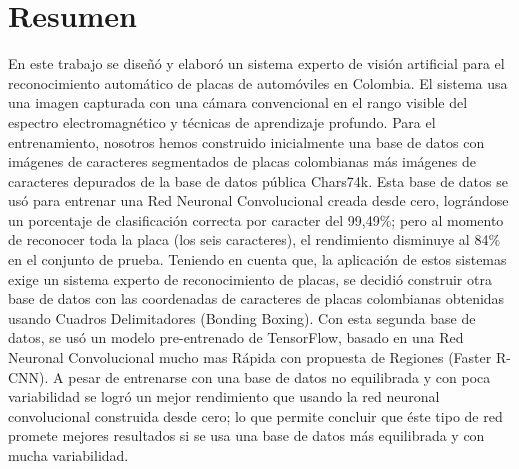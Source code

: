 \chapter*{Resumen}
\setcounter{page}{3}
 En este trabajo se diseñó y elaboró un sistema experto de visión artificial para el reconocimiento automático de placas de automóviles en Colombia. El sistema usa una imagen capturada con una cámara convencional en el rango visible del espectro electromagnético y técnicas de aprendizaje profundo. 
 Para el entrenamiento, nosotros hemos construido inicialmente una base de datos con imágenes de caracteres segmentados de placas colombianas más imágenes de caracteres depurados de la base de datos pública Chars74k. Esta base de datos se usó para entrenar una Red Neuronal Convolucional creada desde cero, lográndose un porcentaje de clasificación correcta por caracter del 99,49\%; pero al momento de reconocer toda la placa (los seis caracteres), el rendimiento disminuye al 84\% en el conjunto de prueba. Teniendo en cuenta que, la aplicación de estos sistemas exige un sistema experto de reconocimiento de placas, se decidió construir otra base de datos con las coordenadas de caracteres de placas colombianas obtenidas usando Cuadros Delimitadores (Bonding Boxing). Con esta segunda base de datos, se usó un modelo pre-entrenado de TensorFlow, basado en una Red Neuronal Convolucional mucho mas Rápida con propuesta de Regiones (Faster R-CNN). A pesar de entrenarse con una base de datos no equilibrada y con poca variabilidad se logró un mejor rendimiento que usando la red neuronal convolucional construida desde cero; lo que permite concluir que éste tipo de red promete mejores resultados si se usa una base de datos más equilibrada y con mucha variabilidad. 
 
\newpage
